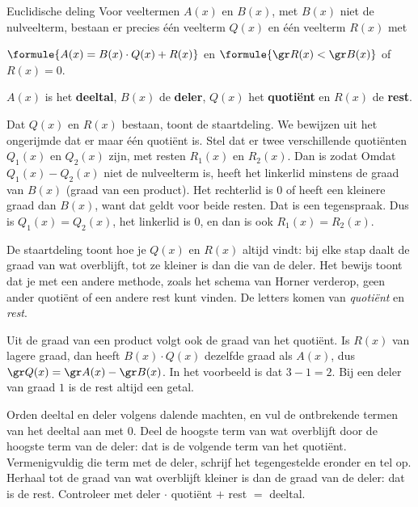 \begin{theorie}
\begin{stelling}{Euclidische deling}
Voor veeltermen $A(x)$ en $B(x)$, met $B(x)$ niet de nulveelterm, bestaan er precies één veelterm $Q(x)$ en één veelterm $R(x)$ met

\qquad $\formule{A(x) = B(x) \cdot Q(x) + R(x)}$ \qquad en \qquad $\formule{\gr R(x) < \gr B(x)}$ of $R(x) = 0$.

$A(x)$ is het \textbf{\textcolor{accent}{deeltal}}, $B(x)$ de \textbf{\textcolor{accent}{deler}}, $Q(x)$ het \textbf{\textcolor{accent}{quotiënt}} en $R(x)$ de \textbf{\textcolor{accent}{rest}}.
\end{stelling}
\begin{bewijs}
Dat $Q(x)$ en $R(x)$ bestaan, toont de staartdeling. We bewijzen uit het ongerijmde dat er maar één quotiënt is. Stel dat er twee verschillende quotiënten $Q_1(x)$ en $Q_2(x)$ zijn, met resten $R_1(x)$ en $R_2(x)$. Dan is
zodat
Omdat $Q_1(x) - Q_2(x)$ niet de nulveelterm is, heeft het linkerlid minstens de graad van $B(x)$ (graad van een product). Het rechterlid is $0$ of heeft een kleinere graad dan $B(x)$, want dat geldt voor beide resten. Dat is een tegenspraak. Dus is $Q_1(x) = Q_2(x)$, het linkerlid is $0$, en dan is ook $R_1(x) = R_2(x)$.
\end{bewijs}
\end{theorie}

De staartdeling toont hoe je $Q(x)$ en $R(x)$ altijd vindt: bij elke stap daalt de graad van wat overblijft, tot ze kleiner is dan die van de deler. Het bewijs toont dat je met een andere methode, zoals het schema van Horner verderop, geen ander quotiënt of een andere rest kunt vinden. De letters komen van \textit{quotiënt} en \textit{rest}.

Uit de graad van een product volgt ook de graad van het quotiënt. Is $R(x)$ van lagere graad, dan heeft $B(x) \cdot Q(x)$ dezelfde graad als $A(x)$, dus $\gr Q(x) = \gr A(x) - \gr B(x)$. In het voorbeeld is dat $3 - 1 = 2$. Bij een deler van graad $1$ is de rest altijd een getal.

\begin{werkwijze}
Orden deeltal en deler volgens dalende machten, en vul de ontbrekende termen van het deeltal aan met $0$. Deel de hoogste term van wat overblijft door de hoogste term van de deler: dat is de volgende term van het quotiënt. Vermenigvuldig die term met de deler, schrijf het tegengestelde eronder en tel op. Herhaal tot de graad van wat overblijft kleiner is dan de graad van de deler: dat is de rest. Controleer met deler $\cdot$ quotiënt $+$ rest $=$ deeltal.
\end{werkwijze}

